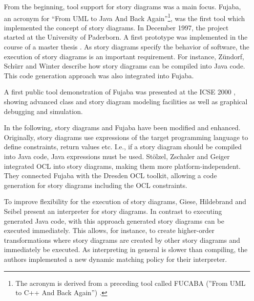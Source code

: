 From the beginning, tool support for story diagrams was a main focus.
Fujaba, an acronym for ``From UML to Java And Back Again''\footnote{The acronym is derived from a preceding tool called FUCABA (''From UML to C++ And Back Again'') \cite{JZ97}.}, was the first tool which implemented the concept of story diagrams.
In December 1997, the project started at the University of Paderborn.
A first prototype was implemented in the course of a master thesis \cite{FNT98}.
As story diagrams specify the behavior of software, the execution of story diagrams is an important requirement.
For instance, Z\"{u}ndorf, Sch\"{u}rr and Winter \cite{ZSW99} describe how story diagrams can be compiled into Java code.
This code generation approach was also integrated into Fujaba.

A first public tool demonstration of Fujaba was presented at the ICSE 2000 \cite{NNZ00}, showing advanced class and story diagram modeling facilities as well as graphical debugging and simulation.

In the following, story diagrams and Fujaba have been modified and enhanced.
Originally, story diagrams use expressions of the target programming language to define constraints, return values etc.
I.e., if a story diagram should be compiled into Java code, Java expressions must be used.
St\"{o}lzel, Zschaler and Geiger \cite{SZG07} integrated OCL into story diagrams, making them more platform-independent.
They connected Fujaba with the Dresden OCL toolkit, allowing a code generation for story diagrams including the OCL constraints.

To improve flexibility for the execution of story diagrams, Giese, Hildebrand and Seibel \cite{GHS09} present an interpreter for story diagrams.
In contrast to executing generated Java code, with this approach generated story diagrams can be executed immediately.
This allows, for instance, to create higher-order transformations where story diagrams are created by other story diagrams and immediately be executed.
As interpreting in general is slower than compiling, the authors implemented a new dynamic matching policy for their interpreter.

